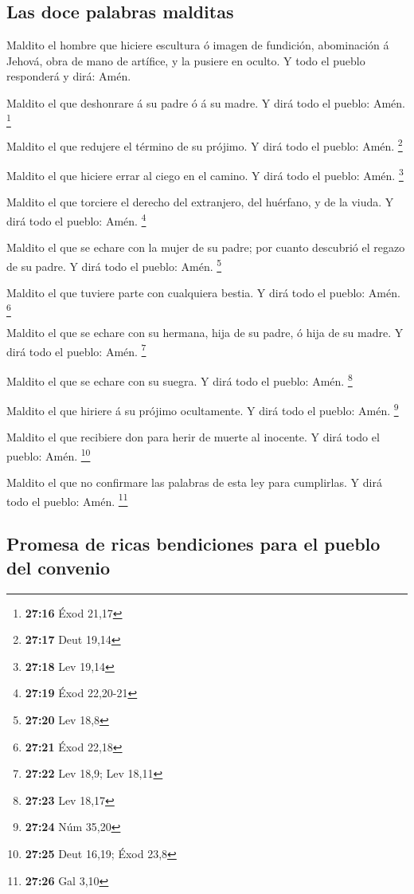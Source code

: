 \hypertarget{las-doce-palabras-malditas}{%
\subsection{Las doce palabras
malditas}\label{las-doce-palabras-malditas}}

 Maldito el hombre que hiciere escultura ó imagen de
fundición, abominación á Jehová, obra de mano de artífice, y la pusiere
en oculto. Y todo el pueblo responderá y dirá: Amén.

 Maldito el que deshonrare á su padre ó á su madre. Y dirá
todo el pueblo: Amén. \footnote{\textbf{27:16} Éxod 21,17}

 Maldito el que redujere el término de su prójimo. Y dirá
todo el pueblo: Amén. \footnote{\textbf{27:17} Deut 19,14}

 Maldito el que hiciere errar al ciego en el camino. Y dirá
todo el pueblo: Amén. \footnote{\textbf{27:18} Lev 19,14}

 Maldito el que torciere el derecho del extranjero, del
huérfano, y de la viuda. Y dirá todo el pueblo: Amén. \footnote{\textbf{27:19}
  Éxod 22,20-21}

 Maldito el que se echare con la mujer de su padre; por
cuanto descubrió el regazo de su padre. Y dirá todo el pueblo: Amén.
\footnote{\textbf{27:20} Lev 18,8}

 Maldito el que tuviere parte con cualquiera bestia. Y dirá
todo el pueblo: Amén. \footnote{\textbf{27:21} Éxod 22,18}

 Maldito el que se echare con su hermana, hija de su padre,
ó hija de su madre. Y dirá todo el pueblo: Amén. \footnote{\textbf{27:22}
  Lev 18,9; Lev 18,11}

 Maldito el que se echare con su suegra. Y dirá todo el
pueblo: Amén. \footnote{\textbf{27:23} Lev 18,17}

 Maldito el que hiriere á su prójimo ocultamente. Y dirá
todo el pueblo: Amén. \footnote{\textbf{27:24} Núm 35,20}

 Maldito el que recibiere don para herir de muerte al
inocente. Y dirá todo el pueblo: Amén. \footnote{\textbf{27:25} Deut
  16,19; Éxod 23,8}

 Maldito el que no confirmare las palabras de esta ley para
cumplirlas. Y dirá todo el pueblo: Amén. \footnote{\textbf{27:26} Gal
  3,10}

\hypertarget{promesa-de-ricas-bendiciones-para-el-pueblo-del-convenio}{%
\subsection{Promesa de ricas bendiciones para el pueblo del
convenio}\label{promesa-de-ricas-bendiciones-para-el-pueblo-del-convenio}}

